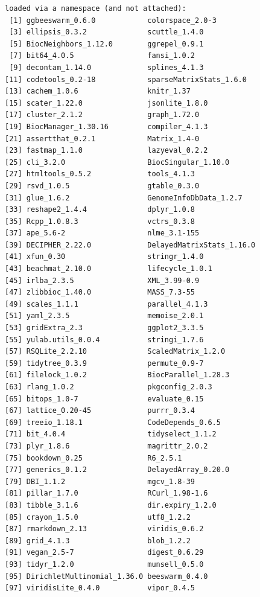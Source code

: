 \documentclass[
]{book}
\begin{document}
\begin{verbatim}
loaded via a namespace (and not attached):
 [1] ggbeeswarm_0.6.0            colorspace_2.0-3           
 [3] ellipsis_0.3.2              scuttle_1.4.0              
 [5] BiocNeighbors_1.12.0        ggrepel_0.9.1              
 [7] bit64_4.0.5                 fansi_1.0.2                
 [9] decontam_1.14.0             splines_4.1.3              
[11] codetools_0.2-18            sparseMatrixStats_1.6.0    
[13] cachem_1.0.6                knitr_1.37                 
[15] scater_1.22.0               jsonlite_1.8.0             
[17] cluster_2.1.2               graph_1.72.0               
[19] BiocManager_1.30.16         compiler_4.1.3             
[21] assertthat_0.2.1            Matrix_1.4-0               
[23] fastmap_1.1.0               lazyeval_0.2.2             
[25] cli_3.2.0                   BiocSingular_1.10.0        
[27] htmltools_0.5.2             tools_4.1.3                
[29] rsvd_1.0.5                  gtable_0.3.0               
[31] glue_1.6.2                  GenomeInfoDbData_1.2.7     
[33] reshape2_1.4.4              dplyr_1.0.8                
[35] Rcpp_1.0.8.3                vctrs_0.3.8                
[37] ape_5.6-2                   nlme_3.1-155               
[39] DECIPHER_2.22.0             DelayedMatrixStats_1.16.0  
[41] xfun_0.30                   stringr_1.4.0              
[43] beachmat_2.10.0             lifecycle_1.0.1            
[45] irlba_2.3.5                 XML_3.99-0.9               
[47] zlibbioc_1.40.0             MASS_7.3-55                
[49] scales_1.1.1                parallel_4.1.3             
[51] yaml_2.3.5                  memoise_2.0.1              
[53] gridExtra_2.3               ggplot2_3.3.5              
[55] yulab.utils_0.0.4           stringi_1.7.6              
[57] RSQLite_2.2.10              ScaledMatrix_1.2.0         
[59] tidytree_0.3.9              permute_0.9-7              
[61] filelock_1.0.2              BiocParallel_1.28.3        
[63] rlang_1.0.2                 pkgconfig_2.0.3            
[65] bitops_1.0-7                evaluate_0.15              
[67] lattice_0.20-45             purrr_0.3.4                
[69] treeio_1.18.1               CodeDepends_0.6.5          
[71] bit_4.0.4                   tidyselect_1.1.2           
[73] plyr_1.8.6                  magrittr_2.0.2             
[75] bookdown_0.25               R6_2.5.1                   
[77] generics_0.1.2              DelayedArray_0.20.0        
[79] DBI_1.1.2                   mgcv_1.8-39                
[81] pillar_1.7.0                RCurl_1.98-1.6             
[83] tibble_3.1.6                dir.expiry_1.2.0           
[85] crayon_1.5.0                utf8_1.2.2                 
[87] rmarkdown_2.13              viridis_0.6.2              
[89] grid_4.1.3                  blob_1.2.2                 
[91] vegan_2.5-7                 digest_0.6.29              
[93] tidyr_1.2.0                 munsell_0.5.0              
[95] DirichletMultinomial_1.36.0 beeswarm_0.4.0             
[97] viridisLite_0.4.0           vipor_0.4.5                
\end{verbatim}
\end{document}
